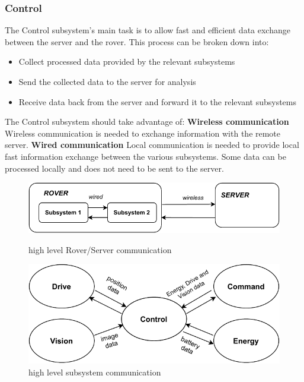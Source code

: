 \documentclass[10pt,twoside]{article}
\begin{document}
\newpage
\subsubsection{Control}

The Control subsystem's main task is to allow fast and efficient data exchange between the server and the rover. This process can be broken down into:
\begin{itemize}
    \item Collect processed data provided by the relevant subsystems
    \item Send the collected data to the server for analysis
    \item Receive data back from the server and forward it to the relevant subsystems
\end{itemize}

The Control subsystem should take advantage of: \newline
\smallskip
\textbf{Wireless communication} Wireless communication is needed to exchange information with the remote server. \newline
\smallskip
\textbf{Wired communication} Local communication is needed to provide local fast information exchange between the various subsystems. Some data can be processed locally and does not need to be sent to the server.

\begin{figure}[hbt!]
  \begin{minipage}[b]{0.44\textwidth}
    \centering
    \includegraphics[scale = 0.73]{Server_to_rover_v2.pdf}
    \caption{high level Rover/Server communication}
    \label{fig:server_to_rover}
  \end{minipage}
  \hfill
  \begin{minipage}[b]{0.44\textwidth}
    \includegraphics[scale = 0.7]{Finial_Comms_Highlevel.pdf}
    \caption{high level subsystem communication}
    \label{fig:subsystem_communication}
  \end{minipage}
\end{figure}
\end{document}

